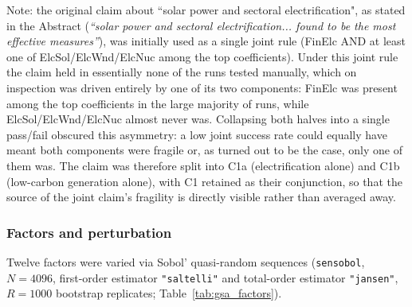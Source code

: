 \documentclass[sn-basic]{sn-jnl}%
\begin{document}
Note: the original claim about ``solar power and sectoral electrification", as stated in the Abstract (\textit{``solar power and sectoral electrification... found to be the most effective measures''}), was initially used as a single joint rule (FinElc AND at least one of ElcSol/ElcWnd/ElcNuc among the top coefficients). Under this joint rule the claim held in essentially none of the runs tested manually, which on inspection was driven entirely by one of its two components: FinElc was present among the top coefficients in the large majority of runs, while ElcSol/ElcWnd/ElcNuc almost never was. Collapsing both halves into a single pass/fail obscured this asymmetry: a low joint success rate could equally have meant both components were fragile or, as turned out to be the case, only one of them was. The claim was therefore split into C1a (electrification alone) and C1b (low-carbon generation alone), with C1 retained as their conjunction, so that the source of the joint claim's fragility is directly visible rather than averaged away.

\subsubsection{Factors and perturbation}


Twelve factors were varied via Sobol' quasi-random sequences
(\texttt{sensobol}, $N=4096$, first-order estimator \texttt{"saltelli"} and
total-order estimator \texttt{"jansen"}, $R=1000$ bootstrap replicates; Table~\ref{tab:gsa_factors}).
\end{document}
